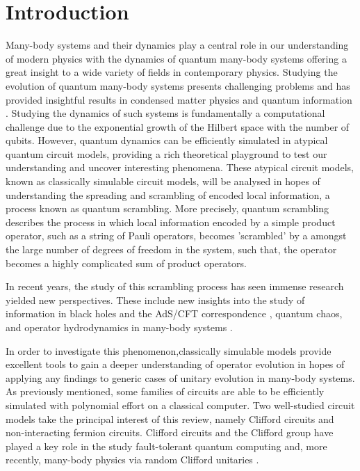 

\section{Introduction}
Many-body systems and their dynamics play a central role in our understanding of modern physics with the
dynamics of quantum many-body systems offering a great insight to a wide variety of fields in contemporary physics. Studying the evolution of quantum many-body systems presents challenging problems and has provided insightful results in condensed matter physics and quantum information \cite{Polkovnikov_2011}.
Studying the dynamics of such systems is fundamentally
a computational challenge due to the exponential growth of the Hilbert space with the number of
qubits. However, quantum dynamics can be efficiently simulated in atypical quantum circuit models,
providing a rich theoretical playground to test our understanding and uncover interesting phenomena.
These atypical circuit models, known as classically simulable circuit models, 
will be analysed in hopes of understanding the spreading and scrambling of encoded local information,
a process known as quantum scrambling. More precisely, quantum scrambling describes the
process in which local information encoded by a simple product operator, such as a string of Pauli operators, becomes 'scrambled' by a  amongst the large number of degrees of freedom in the system, such that, the operator becomes a highly complicated sum of product operators.

In recent years, the study of this scrambling process has seen immense research yielded new perspectives. These include new insights into the study of information in black holes and the 
AdS/CFT correspondence \cite{Calabrese_2009,Jensen_2016,Sekino_2008,ShenkerBlackHolesButterfly2014},
quantum chaos, \cite{Maldacena_2016, https://doi.org/10.48550/arxiv.1412.6087} and operator hydrodynamics in many-body systems \cite{Khemani_2018, PhysRevX.8.021013, PhysRevX.8.031058,Grozdanov_2018}.

In order to investigate this phenomenon,classically simulable models provide excellent tools to gain a deeper understanding of operator evolution in hopes of applying any findings
to generic cases of unitary evolution in many-body systems.
As previously mentioned, some families of circuits are able to be efficiently
simulated with polynomial effort on a classical computer. Two well-studied circuit models take the principal interest of this review, namely Clifford circuits and non-interacting fermion circuits. Clifford circuits and the Clifford
group have played a key role in the study fault-tolerant quantum computing and, more recently, many-body physics via
random Clifford unitaries \cite{PhysRevB.98.205136, https://doi.org/10.48550/arxiv.2110.02988}.



